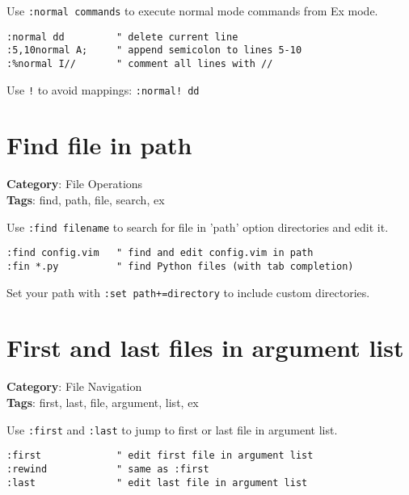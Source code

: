{{{{{{Use {\footnotesize \Verb§:normal commands§} to execute normal mode commands from Ex mode.

\begin{Exa*}{}
\begin{Verbatim}[fontsize=\footnotesize, breaklines, breakanywhere]
:normal dd         " delete current line
:5,10normal A;     " append semicolon to lines 5-10
:%normal I//       " comment all lines with //
\end{Verbatim}
\end{Exa*}

Use {\footnotesize \Verb§!§} to avoid mappings: {\footnotesize \Verb§:normal! dd§}

\section{Find file in path}

\textbf{Category}: File Operations\\ \textbf{Tags}: find, path, file, search, ex
\vspace{0.5cm}

Use {\footnotesize \Verb§:find filename§} to search for file in 'path' option directories and edit it.

\begin{Exa*}{}
\begin{Verbatim}[fontsize=\footnotesize, breaklines, breakanywhere]
:find config.vim   " find and edit config.vim in path
:fin *.py          " find Python files (with tab completion)
\end{Verbatim}
\end{Exa*}

Set your path with {\footnotesize \Verb§:set path+=directory§} to include custom directories.

\section{First and last files in argument list}

\textbf{Category}: File Navigation\\ \textbf{Tags}: first, last, file, argument, list, ex
\vspace{0.5cm}

Use {\footnotesize \Verb§:first§} and {\footnotesize \Verb§:last§} to jump to first or last file in argument list.

\begin{Exa*}{}
\begin{Verbatim}[fontsize=\footnotesize, breaklines, breakanywhere]
:first             " edit first file in argument list
:rewind            " same as :first
:last              " edit last file in argument list
\end{Verbatim}
\end{Exa*}

}}}}}}

